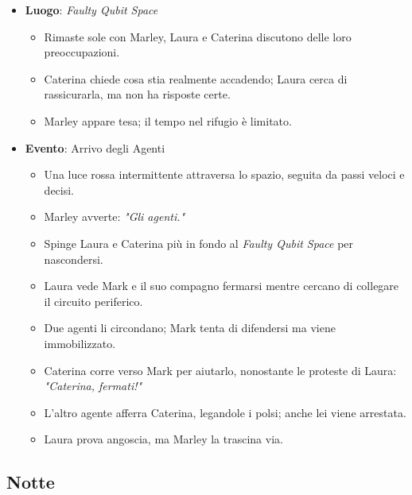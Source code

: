 \begin{itemize}
    \item \textbf{Luogo}: \emph{Faulty Qubit Space}
    \begin{itemize}
        \item Rimaste sole con Marley, Laura e Caterina discutono delle loro preoccupazioni.
        \item Caterina chiede cosa stia realmente accadendo; Laura cerca di rassicurarla, ma non ha risposte certe.
        \item Marley appare tesa; il tempo nel rifugio è limitato.
    \end{itemize}

    \item \textbf{Evento}: Arrivo degli Agenti
    \begin{itemize}
        \item Una luce rossa intermittente attraversa lo spazio, seguita da passi veloci e decisi.
        \item Marley avverte: \emph{"Gli agenti."}
        \item Spinge Laura e Caterina più in fondo al \emph{Faulty Qubit Space} per nascondersi.
        \item Laura vede Mark e il suo compagno fermarsi mentre cercano di collegare il circuito periferico.
        \item Due agenti li circondano; Mark tenta di difendersi ma viene immobilizzato.
        \item Caterina corre verso Mark per aiutarlo, nonostante le proteste di Laura: \emph{"Caterina, fermati!"}
        \item L'altro agente afferra Caterina, legandole i polsi; anche lei viene arrestata.
        \item Laura prova angoscia, ma Marley la trascina via.
    \end{itemize}
\end{itemize}

\subsection*{Notte}

